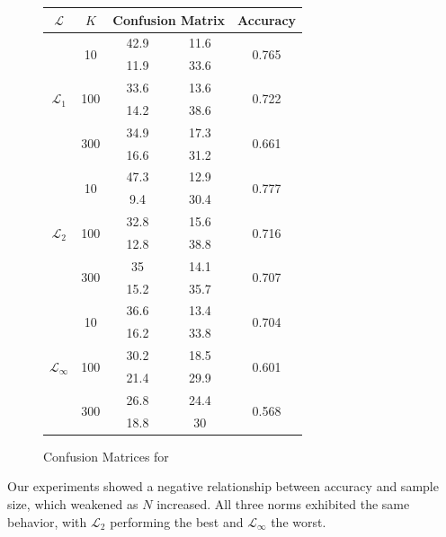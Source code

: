 \documentclass{article}
\begin{document}
\begin{figure}[H]
\centering
\begin{tabular}{|c|c|c|c|c|}
\hline
$\mathcal{L}$&$K$&\multicolumn{2}{|c|}{Confusion Matrix}&Accuracy\\
\hline
\multirow{6}{*}{$\mathcal{L}_1$}&\multirow{2}{*}{10}&42.9&11.6&\multirow{2}{*}{0.765}\\
\cline{3-4}
&&11.9&33.6&\\
\cline{2-5}
&\multirow{2}{*}{100}&33.6&13.6&\multirow{2}{*}{0.722}\\
\cline{3-4}
&&14.2&38.6&\\
\cline{2-5}
&\multirow{2}{*}{300}&34.9&17.3&\multirow{2}{*}{0.661}\\
\cline{3-4}
&&16.6&31.2&\\
\hline
\multirow{6}{*}{$\mathcal{L}_2$}&\multirow{2}{*}{10}&47.3&12.9&\multirow{2}{*}{0.777}\\
\cline{3-4}
&&9.4&30.4&\\
\cline{2-5}
&\multirow{2}{*}{100}&32.8&15.6&\multirow{2}{*}{0.716}\\
\cline{3-4}
&&12.8&38.8&\\
\cline{2-5}
&\multirow{2}{*}{300}&35&14.1&\multirow{2}{*}{0.707}\\
\cline{3-4}
&&15.2&35.7&\\
\hline
\multirow{6}{*}{$\mathcal{L}_{\infty}$}&\multirow{2}{*}{10}&36.6&13.4&\multirow{2}{*}{0.704}\\
\cline{3-4}
&&16.2&33.8&\\
\cline{2-5}
&\multirow{2}{*}{100}&30.2&18.5&\multirow{2}{*}{0.601}\\
\cline{3-4}
&&21.4&29.9&\\
\cline{2-5}
&\multirow{2}{*}{300}&26.8&24.4&\multirow{2}{*}{0.568}\\
\cline{3-4}
&&18.8&30&\\
\hline
\end{tabular}
\caption{Confusion Matrices for  }\label{fig:cm-exp1-2-accuracy-k}
\end{figure}
Our experiments showed a negative relationship between accuracy and sample size, which weakened as $N$ increased. All three norms exhibited the same behavior, with $\mathcal{L}_2$ performing the best and $\mathcal{L}_{\infty}$ the worst.
\end{document}
